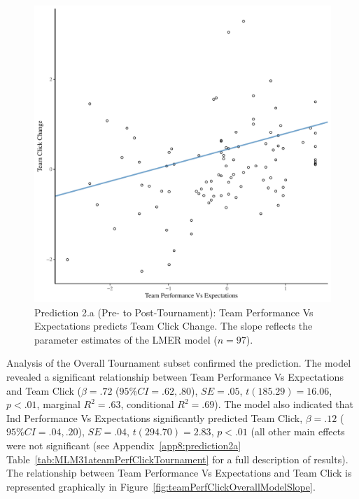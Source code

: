 \begin{CJK}{UTF8}{gbsn}



    \begin{figure}[htbp]
      \centering
    \includegraphics[scale=.5]{images/teamPerfClickDeltaModelSlope.pdf}
      \caption{Prediction 2.a (Pre- to Post-Tournament): Team Performance Vs Expectations predicts Team Click Change. The slope reflects the parameter estimates of the LMER model ($n = 97$).}
      \label{fig:teamPerfClickDeltaModelSlope}
    \end{figure}


Analysis of the Overall Tournament subset confirmed the prediction.
The model revealed a significant relationship between Team Performance Vs Expectations and Team Click ($\beta = .72$ ($95\% CI = .62, .80$), $SE = .05$, $t(185.29) = 16.06$, $p < .01$, marginal $R^2 = .63$, conditional $R^2 = .69$).
The model also indicated that Ind Performance Vs Expectations significantly predicted Team Click, $\beta = .12$ ($95\% CI =  .04, .20$), $SE = .04$, $t(294.70) = 2.83$, $p < .01$ (all other main effects were not significant (see Appendix~\ref{app8:prediction2a} Table~\ref{tab:MLM31ateamPerfClickTournament} for a full description of results).  The relationship between Team Performance Vs Expectations  and Team Click is represented graphically in Figure~\ref{fig:teamPerfClickOverallModelSlope}.


\end{CJK}
